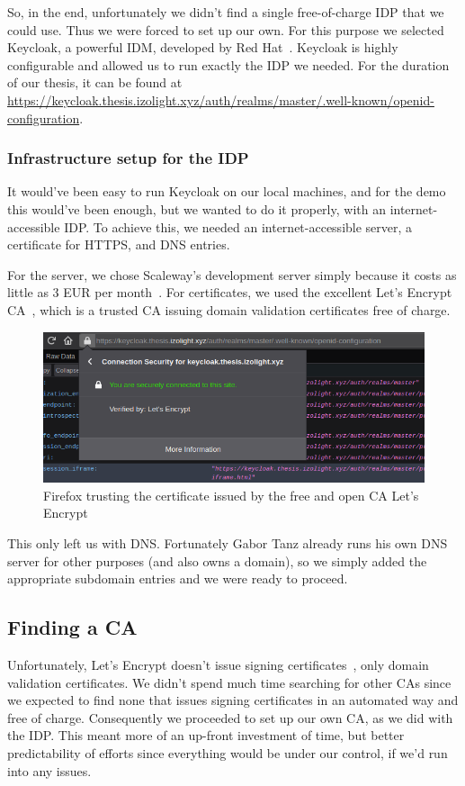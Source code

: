 So, in the end, unfortunately we didn't find a single free-of-charge \gls{IDP} that we could use.
Thus we were forced to set up our own.
For this purpose we selected Keycloak, a powerful \gls{IDM}, developed by Red Hat~\cite{keycloak}.
Keycloak is highly configurable and allowed us to run exactly the \gls{IDP} we needed.
For the duration of our thesis, it can be found at \url{https://keycloak.thesis.izolight.xyz/auth/realms/master/.well-known/openid-configuration}.

\subsubsection{Infrastructure setup for the IDP}
It would've been easy to run Keycloak on our local machines, and for the demo this would've been enough,
but we wanted to do it properly, with an internet-accessible \gls{IDP}.
To achieve this, we needed an internet-accessible server, a certificate for \gls{HTTPS},
and \gls{DNS} entries.

For the server, we chose Scaleway's development server simply because it costs as little as 3 EUR per month~\cite{scaleway}.
For certificates, we used the excellent Let's Encrypt \gls{CA}~\cite{letsencrypt}, which is a trusted \gls{CA} issuing domain validation certificates free of charge.

\begin{figure}
    \begin{center}
        \includegraphics[width=0.7\linewidth]{images/firefox.png}
        \caption{Firefox trusting the certificate issued by the free and open CA Let's Encrypt}
        \label{fig:letsencrypt}
    \end{center}
\end{figure}

This only left us with \gls{DNS}.
Fortunately Gabor Tanz already runs his own \gls{DNS} server for other purposes (and also owns a domain),
so we simply added the appropriate subdomain entries and we were ready to proceed.


\subsection{Finding a CA}\label{subsec:finding-a-ca}
Unfortunately, Let's Encrypt doesn't issue signing certificates~\cite{letsencryptfaq}, only domain validation certificates.
We didn't spend much time searching for other \gls{CA}s since we expected to find none that issues
signing certificates in an automated way and free of charge.
Consequently we proceeded to set up our own \gls{CA}, as we did with the \gls{IDP}.
This meant more of an up-front investment of time,
but better predictability of efforts since everything would be under our control,
if we'd run into any issues.

